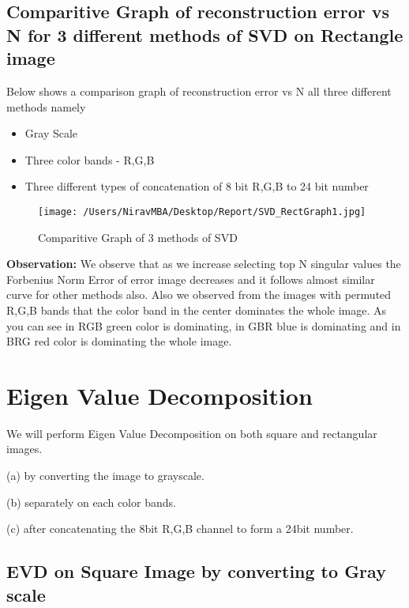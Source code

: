 \documentclass[12pt]{report}
\begin{document}
\section{Comparitive Graph of reconstruction error vs N for 3 different methods of SVD on Rectangle image }

Below shows a comparison graph of reconstruction error vs N all three different methods namely \\  

\begin{itemize}
	\item Gray Scale
	\item Three color bands - R,G,B
	\item Three different types of concatenation of 8 bit R,G,B to 24 bit number
\end{itemize}


\begin{figure}[H]
	
	\texttt{[image: /Users/NiravMBA/Desktop/Report/SVD\_RectGraph1.jpg]}
	\caption{Comparitive Graph of 3 methods of SVD}
\end{figure}

{\bfseries Observation: }
We observe that as we increase selecting top N singular values the Forbenius Norm Error of error image decreases and it follows almost similar curve for other
methods also. Also we observed from the images with permuted R,G,B bands that the color band 
in the center dominates the whole image. As you can see in RGB green color is dominating, in 
GBR blue is dominating and in BRG red color is dominating the whole image.\\




\chapter{Eigen Value Decomposition}

We will perform Eigen Value Decomposition on both square and rectangular images.

(a) by converting the image to grayscale.

(b) separately on each color bands.

(c) after concatenating the 8bit R,G,B channel to form a 24bit number. 

\section{EVD on Square Image by converting to Gray scale}
\end{document}
